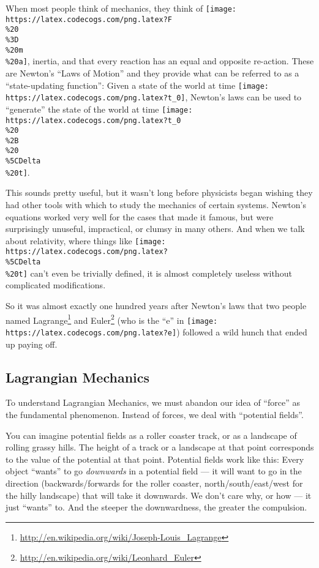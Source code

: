 \documentclass[]{article}
\renewcommand{\href}[2]{#2\footnote{\url{#1}}}
\begin{document}
When most people think of mechanics, they think of
\texttt{[image: https://latex.codecogs.com/png.latex?F\\\%20\\\%3D\\\%20m\\\%20a]},
inertia, and that every reaction has an equal and opposite re-action. These are
Newton's ``Laws of Motion'' and they provide what can be referred to as a
``state-updating function'': Given a state of the world at time
\texttt{[image: https://latex.codecogs.com/png.latex?t\_0]}, Newton's laws can be
used to ``generate'' the state of the world at time
\texttt{[image: https://latex.codecogs.com/png.latex?t\_0\\\%20\\\%2B\\\%20\\\%5CDelta\\\%20t]}.

This sounds pretty useful, but it wasn't long before physicists began wishing
they had other tools with which to study the mechanics of certain systems.
Newton's equations worked very well for the cases that made it famous, but were
surprisingly unuseful, impractical, or clumsy in many others. And when we talk
about relativity, where things like
\texttt{[image: https://latex.codecogs.com/png.latex?\\\%5CDelta\\\%20t]} can't even
be trivially defined, it is almost completely useless without complicated
modifications.

So it was almost exactly one hundred years after Newton's laws that two people
named \href{http://en.wikipedia.org/wiki/Joseph-Louis_Lagrange}{Lagrange} and
\href{http://en.wikipedia.org/wiki/Leonhard_Euler}{Euler} (who is the ``e'' in
\texttt{[image: https://latex.codecogs.com/png.latex?e]}) followed a wild hunch
that ended up paying off.

\hypertarget{lagrangian-mechanics}{%
\subsection{Lagrangian Mechanics}\label{lagrangian-mechanics}}

To understand Lagrangian Mechanics, we must abandon our idea of ``force'' as the
fundamental phenomenon. Instead of forces, we deal with ``potential fields''.

You can imagine potential fields as a roller coaster track, or as a landscape of
rolling grassy hills. The height of a track or a landscape at that point
corresponds to the value of the potential at that point. Potential fields work
like this: Every object ``wants'' to go \emph{downwards} in a potential field
--- it will want to go in the direction (backwards/forwards for the roller
coaster, north/south/east/west for the hilly landscape) that will take it
downwards. We don't care why, or how --- it just ``wants'' to. And the steeper
the downwardness, the greater the compulsion.
\end{document}
